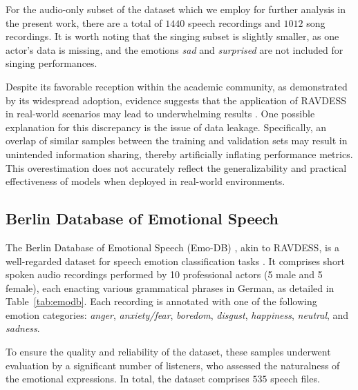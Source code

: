 For the audio-only subset of the dataset which we employ for further analysis in the present work, there are a total of $1440$ speech recordings and $1012$ song recordings. It is worth noting that the singing subset is slightly smaller, as one actor's data is missing, and the emotions \textit{sad} and \textit{surprised} are not included for singing performances.

Despite its favorable reception within the academic community, as demonstrated by its widespread adoption, evidence suggests that the application of RAVDESS in real-world scenarios may lead to underwhelming results \cite{churaev2021}. One possible explanation for this discrepancy is the issue of data leakage. Specifically, an overlap of similar samples between the training and validation sets may result in unintended information sharing, thereby artificially inflating performance metrics. This overestimation does not accurately reflect the generalizability and practical effectiveness of models when deployed in real-world environments.

\subsection{Berlin Database of Emotional Speech} %

The Berlin Database of Emotional Speech (Emo-DB) \cite{emodb}, akin to RAVDESS, is a well-regarded dataset for speech emotion classification tasks \cite{sinith2015, kotti2008, ying2010}. It comprises short spoken audio recordings performed by 10 professional actors (5 male and 5 female), each enacting various grammatical phrases in German, as detailed in Table~\ref{tab:emodb}. Each recording is annotated with one of the following emotion categories: \textit{anger}, \textit{anxiety/fear}, \textit{boredom}, \textit{disgust}, \textit{happiness}, \textit{neutral}, and \textit{sadness}.

To ensure the quality and reliability of the dataset, these samples underwent evaluation by a significant number of listeners, who assessed the naturalness of the emotional expressions. In total, the dataset comprises $535$ speech files.

